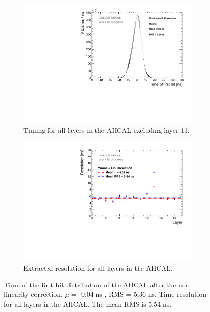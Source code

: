\begin{figure}[htbp!]
	\begin{subfigure}[t]{0.45\textwidth}
		\centering
		\includegraphics[width=1\textwidth]{chap5/fig_AHCAL_timing/Muons/Timing_AHCAL_LinCorrection.pdf}
		\caption{Timing for all layers in the AHCAL excluding layer 11.}\label{fig:timing_lincorrection}
	\end{subfigure}
	\hfill
	\begin{subfigure}[t]{0.45\textwidth}
		\centering
		\includegraphics[width=1\textwidth]{chap5/fig_AHCAL_timing/Muons/ResolutionPerModule_LinCorrection.pdf}
		\caption{Extracted resolution for all layers in the AHCAL.}\label{fig:reso_lincorrection}
	\end{subfigure}
	\caption{ Time of the first hit distribution of the AHCAL after the non-linearity correction. $\mu$ = -0.04 ns , RMS = 5.36 ns.  Time resolution for all layers in the AHCAL. The mean RMS is 5.54 ns.}
\end{figure}

